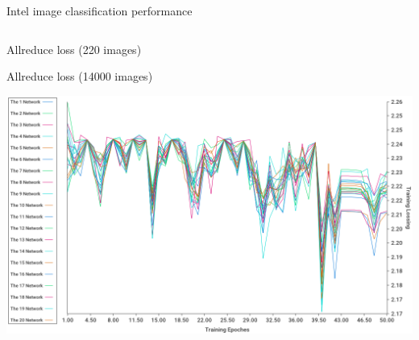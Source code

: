 \documentclass[presentation]{beamer}
\begin{document}
\begin{frame}[label={sec:orgfb39063}]{Intel image classification performance}
\begin{columns}
\begin{column}{0.55\columnwidth}
\begin{block}{Allreduce loss (220 images)}
\begin{center}
\end{center}
Allreduce loss (14000 images)
\begin{center}
\includegraphics[width=.9\linewidth]{./png/intelImage_allreduce_loss.png}
\end{center}
\end{block}
\end{column}
\end{columns}
\end{frame}
\end{document}
